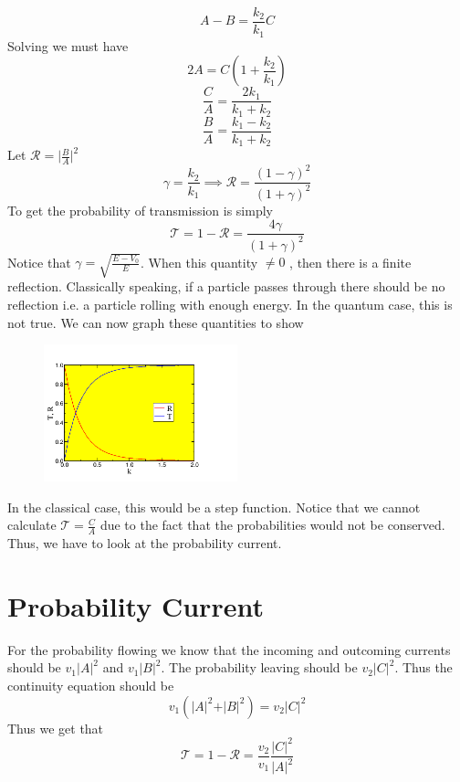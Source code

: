 \[
	A- B = \frac{k_2}{k_1} C
\]
Solving we must have
\[
	2A = C  \left( 1+\frac{k_2}{k_1} \right) 
\]
\[
	\frac{C}{A} = \frac{2k_1}{k_{1} + k_2 }
\]
\[
	\frac{B}{A}= \frac{k_{1}-k_2 }{k_1 + k_2}
\]
Let \(\mathcal{R} = \vert \frac{B}{A} \vert ^{2} \) 
\[
	\gamma = \frac{k_2}{k_1} \implies  \mathcal{R}  = \frac{(1- \gamma)^{2} }{(1 + \gamma)^{2} }
\]
To get the probability of transmission is simply
\[
	\mathcal{T} = 1 - \mathcal{R} = \frac{4\gamma}{(1+\gamma)^{2} }
\]
Notice that \(\gamma = \sqrt{\frac{E-V_0}{E}}  \). When this quantity \( \neq  0 \)  , then there is a finite reflection. Classically speaking, 
if a particle passes through there should be no reflection i.e. a particle rolling with enough energy. In the quantum case, this is not true. We can now graph these quantities to show 

\begin{figure}[H]
	\centering
	\includegraphics[width=0.5\textwidth]{Figures/05.png}
	\caption{}
	\label{fig:}
\end{figure}
\begin{remark}
	In the classical case, this would be a step function. Notice that we cannot calculate \(\mathcal{T} = \frac{C}{A}\) due to the fact that the probabilities would not be conserved. Thus, we have to look at the probability current. 
\end{remark}

\section{Probability Current}
For the probability flowing we know that the incoming and outcoming currents should be \(v_1 \vert A \vert^{2} \) and 
\(v_1 \vert B \vert ^{2} \). The probability leaving should be \(v_2 \vert C \vert ^{2} \). Thus the continuity equation should be 
\[
	v_1 \left( \vert A \vert ^{2} +\vert B \vert ^{2}  \right) = v_2 \vert C \vert ^{2} 
\]   
Thus we get that 
\[
	\mathcal{T} = 1 - \mathcal{R} = \frac{v_2}{v_1} \frac{\vert C \vert ^{2} }{\vert A \vert ^{2} }
\] 

